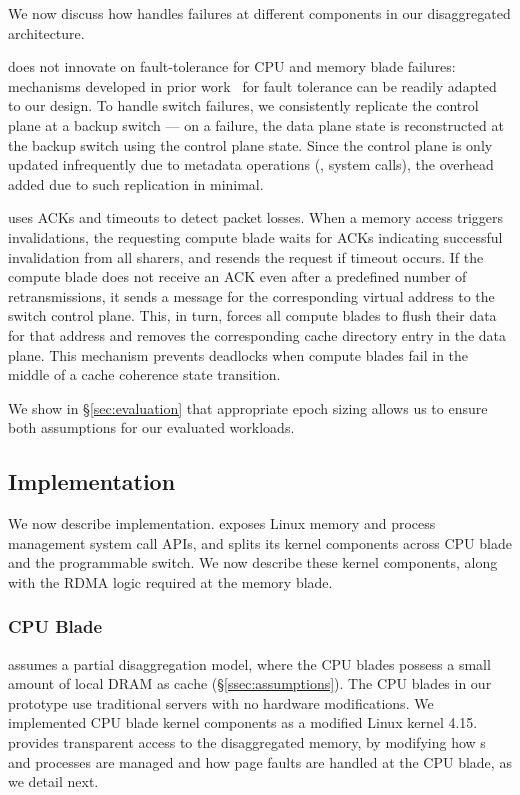 We now discuss how \mind handles failures at different components in our disaggregated architecture.

 \mind does not innovate on fault-tolerance for CPU and memory blade failures: mechanisms developed in prior work~\cite{legoos, infiniswap, disaggfault} for fault tolerance can be readily adapted to our design. To handle switch failures, we consistently replicate the control plane at a backup switch --- on a failure, the data plane state is reconstructed at the backup switch using the control plane state. Since the control plane is only updated infrequently due to metadata operations (\eg, system calls), the overhead added due to such replication in minimal.

 \mind uses ACKs and timeouts to detect packet losses. When a memory access triggers invalidations, the requesting compute blade waits for ACKs indicating successful invalidation from all sharers, and resends the request if timeout occurs. If the compute blade does not receive an ACK even after a predefined number of retransmissions, it sends a  message for the corresponding virtual address to the switch control plane. This, in turn, forces all compute blades to flush their data for that address and removes the corresponding cache directory entry in the data plane. This  mechanism prevents deadlocks when compute blades fail in the middle of a cache coherence state transition.

We show in \S\ref{sec:evaluation} that appropriate epoch sizing allows us to ensure both assumptions for our evaluated workloads.

\subsection{\mind Implementation}
\label{ssec:mindimpl}

We now describe \mind implementation. \mind exposes Linux memory and process management system call APIs, and splits its kernel components across CPU blade and the programmable switch. We now describe these kernel components, along with the RDMA logic required at the memory blade.

\subsubsection{CPU Blade}
\label{sssec:cpumemimpl}

\mind assumes a partial disaggregation model, where the CPU blades possess a small amount of local DRAM as cache (\S\ref{ssec:assumptions}). The CPU blades in our prototype use traditional servers with no hardware modifications. We implemented CPU blade kernel components as a modified Linux kernel 4.15. \mind provides transparent access to the disaggregated memory, by modifying how s and processes are managed and how page faults are handled at the CPU blade, as we detail next.

